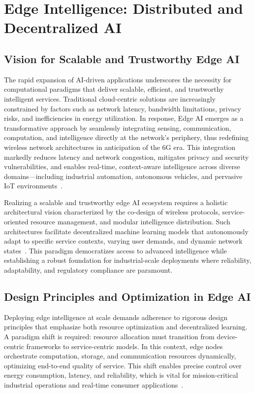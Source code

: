 \section{Edge Intelligence: Distributed and Decentralized AI}

\subsection{Vision for Scalable and Trustworthy Edge AI}

The rapid expansion of AI-driven applications underscores the necessity for computational paradigms that deliver scalable, efficient, and trustworthy intelligent services. Traditional cloud-centric solutions are increasingly constrained by factors such as network latency, bandwidth limitations, privacy risks, and inefficiencies in energy utilization. In response, Edge AI emerges as a transformative approach by seamlessly integrating sensing, communication, computation, and intelligence directly at the network's periphery, thus redefining wireless network architectures in anticipation of the 6G era. This integration markedly reduces latency and network congestion, mitigates privacy and security vulnerabilities, and enables real-time, context-aware intelligence across diverse domains—including industrial automation, autonomous vehicles, and pervasive IoT environments~\cite{ref49}. 

Realizing a scalable and trustworthy edge AI ecosystem requires a holistic architectural vision characterized by the co-design of wireless protocols, service-oriented resource management, and modular intelligence distribution. Such architectures facilitate decentralized machine learning models that autonomously adapt to specific service contexts, varying user demands, and dynamic network states~\cite{ref49}. This paradigm democratizes access to advanced intelligence while establishing a robust foundation for industrial-scale deployments where reliability, adaptability, and regulatory compliance are paramount.

\subsection{Design Principles and Optimization in Edge AI}

Deploying edge intelligence at scale demands adherence to rigorous design principles that emphasize both resource optimization and decentralized learning. A paradigm shift is required: resource allocation must transition from device-centric frameworks to service-centric models. In this context, edge nodes orchestrate computation, storage, and communication resources dynamically, optimizing end-to-end quality of service. This shift enables precise control over energy consumption, latency, and reliability, which is vital for mission-critical industrial operations and real-time consumer applications~\cite{ref49}.

